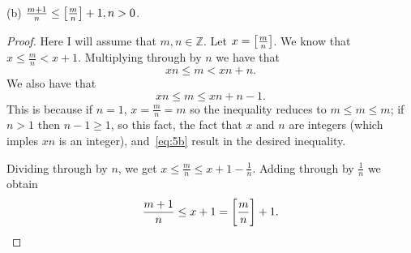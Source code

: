 \documentclass{article}
\newcommand{\Z}{\mathbb{Z}}
\begin{document}
\vspace{5mm}

(b) $\frac{m + 1}{n} \leq \sbr{\frac{m}{n}} + 1, n > 0$.

\begin{proof}

Here I will assume that $m, n \in \Z$. Let $x = \sbr{\frac{m}{n}}$. We
know that $x \leq \frac{m}{n} < x + 1$. Multiplying through by $n$ we
have that
%
\begin{equation}
    x n \leq m < x n + n
    .
    \label{eq:5b}
\end{equation}
%
We also have that
%
\begin{equation*}
    x n \leq m \leq x n + n - 1
    .
\end{equation*}
%
This is because if $n = 1$, $x = \frac{m}{n} = m$ so the inequality
reduces to $m \leq m \leq m$; if $n > 1$ then $n - 1 \geq 1$, so this
fact, the fact that $x$ and $n$ are integers (which imples $x n$ is an
integer), and~\eqref{eq:5b} result in the desired inequality.

Dividing through by $n$, we get
$x \leq \frac{m}{n} \leq x + 1 - \frac{1}{n}$. Adding through by
$\frac{1}{n}$ we obtain
%
\begin{equation*}
    \frac{m + 1}{n} \leq x + 1 = \sbr{\frac{m}{n}} + 1
    .
\end{equation*}

\end{proof}
\end{document}
